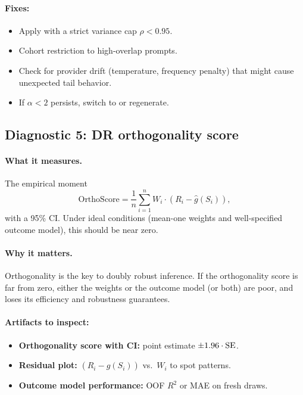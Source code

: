 \paragraph{Fixes:}
\begin{itemize}
\item Apply \simcal{} with a strict variance cap $\rho < 0.95$.
\item Cohort restriction to high-overlap prompts.
\item Check for provider drift (temperature, frequency penalty) that might cause unexpected tail behavior.
\item If $\alpha < 2$ persists, switch to \dr{} or regenerate.
\end{itemize}

\subsection{Diagnostic 5: DR orthogonality score}

\paragraph{What it measures.} The empirical moment
\begin{equation}
\text{OrthoScore} = \frac{1}{n} \sum_{i=1}^n W_i \cdot (R_i - \hat{g}(S_i)),
\end{equation}
with a 95\% CI. Under ideal conditions (mean-one weights and well-specified outcome model), this should be near zero.

\paragraph{Why it matters.} Orthogonality is the key to doubly robust inference. If the orthogonality score is far from zero, either the weights or the outcome model (or both) are poor, and \dr{} loses its efficiency and robustness guarantees.

\paragraph{Artifacts to inspect:}
\begin{itemize}
\item \textbf{Orthogonality score with CI:} point estimate $\pm 1.96 \cdot \operatorname{SE}$.
\item \textbf{Residual plot:} $(R_i - \hat{g}(S_i))$ vs.\ $W_i$ to spot patterns.
\item \textbf{Outcome model performance:} OOF $R^2$ or MAE on fresh draws.
\end{itemize}

